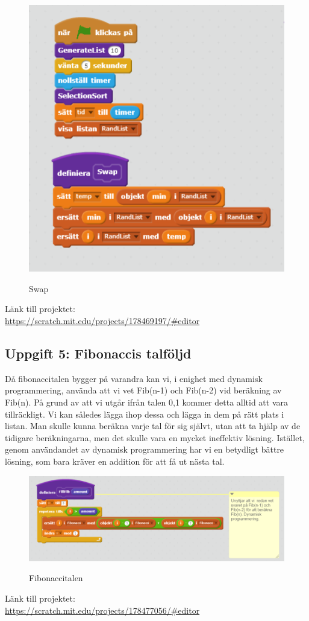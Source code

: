 \documentclass[12pt,a4paper]{article}
\begin{document}
\begin{figure}[H]
	\caption{Swap}
	\centering
	\includegraphics[scale=0.8]{swap}
	\label{fig5:swap}
\end{figure}
Länk till projektet:  \\
 \url{https://scratch.mit.edu/projects/178469197/#editor }
\subsection{Uppgift 5: Fibonaccis talföljd}
Då fibonaccitalen bygger på varandra kan vi, i enighet med dynamisk programmering, använda att vi vet Fib(n-1) och Fib(n-2) vid beräkning av Fib(n). På grund av att vi utgår ifrån talen 0,1 kommer detta alltid att vara tillräckligt. Vi kan således lägga ihop dessa och lägga in dem på rätt plats i listan. Man skulle kunna beräkna varje tal för sig självt, utan att ta hjälp av de tidigare beräkningarna, men det skulle vara en mycket ineffektiv lösning. Istället, genom användandet av dynamisk programmering har vi en betydligt bättre lösning, som bara kräver en addition för att få ut nästa tal.
\begin{figure}[H]
	\caption{Fibonaccitalen}
	\centering
	\includegraphics[scale=0.8]{fib}
	\label{fig6:fib}
\end{figure}
Länk till projektet:  \\
 \url{https://scratch.mit.edu/projects/178477056/#editor }
\end{document}
